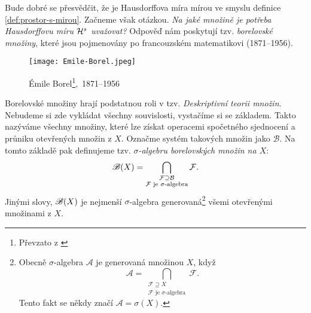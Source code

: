 Bude dobré se přesvědčit, že je Hausdorffova míra mírou ve smyslu definice \ref{def:prostor-s-mirou}. Začneme však otázkou. \emph{Na jaké množině je potřeba Hausdorffovu míru $\mathcal{H}^s$ uvažovat?} Odpověď nám poskytují tzv. \emph{borelovské množiny}, které jsou pojmenovány po francouzském matematikovi  (1871--1956).
\begin{figure}[h]
    \centering
    \texttt{[image: Emile-Borel.jpeg]}
    \caption[Émile Borel,~1871--1956]{Émile Borel\footnote{Převzato z \cite{OConnorBorel2025}},~1871--1956}
\end{figure}
Borelovské množiny hrají podstatnou roli v tzv. \emph{Deskriptivní teorii množin}. Nebudeme si zde vykládat všechny souvislosti, vystačíme si se základem. Takto nazýváme všechny množiny, které lze získat operacemi spočetného sjednocení a průniku otevřených množin z $X$. Označme systém takových množin jako $\mathcal{B}$. Na tomto základě pak definujeme tzv. \emph{$\sigma$-algebru borelovských množin na $X$}:
\[\mathscr{B}(X)=\bigcap_{\substack{\mathcal{F}\supseteq\mathcal{B}\\\text{$\mathcal{F}$ je $\sigma$-algebra}}}\mathcal{F}.\]
Jinými slovy, $\mathscr{B}(X)$ je nejmenší $\sigma$-algebra generovaná\footnote{Obecně $\sigma$-algebra $\mathcal{A}$ je generovaná množinou $X$, když
\[\mathcal{A}=\bigcap_{\substack{\mathcal{F}\supseteq X\\\text{$\mathcal{F}$ je $\sigma$-algebra}}}\mathcal{F}.\]
Tento fakt se někdy značí $\mathcal{A}=\sigma(X)$.} všemi otevřenými množinami z $X$.

